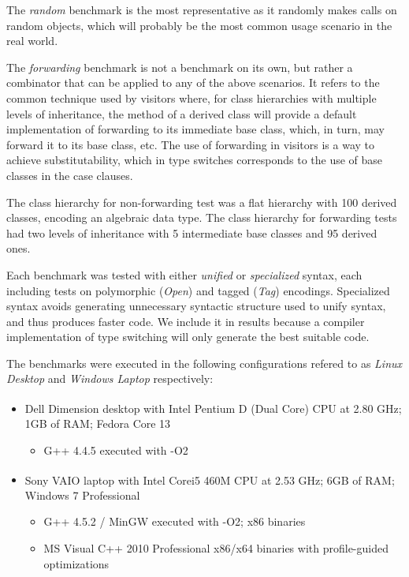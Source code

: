 The \emph{random} benchmark is the most representative as it randomly makes calls on 
random objects, which will probably be the most common usage scenario in the 
real world.

The \emph{forwarding} benchmark is not a benchmark on its own, but rather a 
combinator that can be applied to any of the above scenarios. It refers to the 
common technique used by visitors where, for class hierarchies with multiple 
levels of inheritance, the  method of a derived class will provide a 
default implementation of forwarding to its immediate base class, which, in turn, 
may forward it to its base class, etc. The use of forwarding in visitors is a 
way to achieve substitutability, which in type switches corresponds to the use 
of base classes in the case clauses.

The class hierarchy for non-forwarding test was a flat hierarchy with 100 
derived classes, encoding an algebraic data type. The class hierarchy for 
forwarding tests had two levels of inheritance with 5 intermediate base classes 
and 95 derived ones. 

Each benchmark was tested with either \emph{unified} or \emph{specialized} 
syntax, each including tests on polymorphic (\emph{Open}) and tagged 
(\emph{Tag}) encodings. Specialized syntax avoids generating unnecessary 
syntactic structure used to unify syntax, and thus produces faster code. We 
include it in results because a compiler implementation of type switching 
will only generate the best suitable code.

The benchmarks were executed in the following configurations refered to as 
\emph{Linux Desktop} and \emph{Windows Laptop} respectively:

\begin{itemize}
\setlength{\itemsep}{0pt}
\setlength{\parskip}{0pt}
\item Dell Dimension\textsuperscript{\textregistered} desktop with Intel\textsuperscript{\textregistered} Pentium\textsuperscript{\textregistered} 
      D (Dual Core) CPU at 2.80 GHz; 1GB of RAM; Fedora Core 13  
      \begin{itemize}
      \setlength{\itemsep}{0pt}
      \setlength{\parskip}{0pt}
      \item G++ 4.4.5 executed with -O2
      \end{itemize}
\item Sony VAIO\textsuperscript{\textregistered} laptop with Intel\textsuperscript{\textregistered} Core\texttrademark i5 460M 
      CPU at 2.53 GHz; 6GB of RAM; Windows 7 Professional
      \begin{itemize}
      \setlength{\itemsep}{0pt}
      \setlength{\parskip}{0pt}
      \item G++ 4.5.2 / MinGW executed with -O2; x86 binaries
      \item MS Visual C++ 2010 Professional x86/x64 binaries with profile-guided optimizations
      \end{itemize}
\end{itemize}

